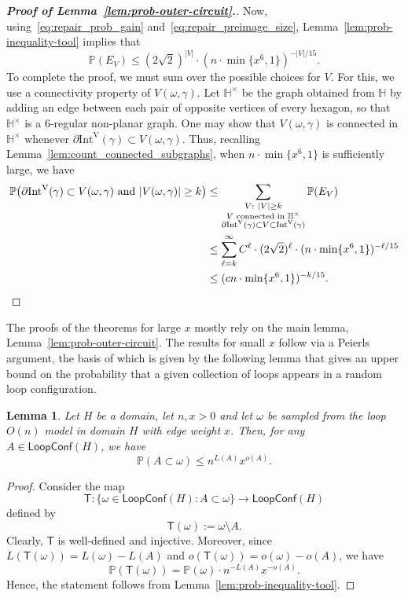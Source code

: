 \documentclass[12pt,reqno]{article}
\newtheorem{lemma}[theorem]{Lemma}
\renewcommand{\Pr}{\mathbb{P}}
\newcommand{\HH}{\mathbb{H}}
\newcommand{\LC}{\mathsf{LoopConf}}
\newcommand{\sfT}{\mathsf{T}}
\newcommand{\IntVert}[1]{\mathrm{Int}^\mathrm{V}(#1)}
\begin{document}
\begin{proof}[{\bf Proof of Lemma~\ref{lem:prob-outer-circuit}.}]
Now, using~\eqref{eq:repair_prob_gain} and~\eqref{eq:repair_preimage_size}, Lemma~\ref{lem:prob-inequality-tool} implies that
\[ \Pr(E_V) \le (2\sqrt{2})^{|V|} \cdot (n \cdot \min\{x^6,1\})^{-|V|/15} .\]
To complete the proof, we must sum over the possible choices for $V$.
For this, we use a connectivity property of $V(\omega,\gamma)$. Let $\HH^{\times}$ be the graph obtained from $\HH$ by adding an edge between each pair of opposite vertices of every hexagon, so that $\HH^{\times}$ is a $6$-regular non-planar graph.
One may show that $V(\omega,\gamma)$ is connected in $\HH^{\times}$ whenever $\partial\IntVert\gamma\subset V(\omega,\gamma)$. Thus, recalling Lemma~\ref{lem:count_connected_subgraphs}, when $n \cdot \min\{x^6,1\}$ is sufficiently large, we have
\begin{align*}
\Pr\big(\partial\IntVert\gamma\subset V(\omega,\gamma)\text{ and }|V(\omega,\gamma)|\ge k \big)
 &\le \sum_{\substack{V:~ |V| \ge k\\V\text{ connected in }\HH^\times\\\partial \IntVert\gamma \subset V \subset \IntVert\gamma}} \Pr(E_V) \\
&\le \sum_{\ell=k}^\infty C^\ell \cdot (2\sqrt{2})^\ell \cdot (n \cdot \min\{x^6,1\})^{-\ell/15} \\&\le (cn \cdot \min\{x^6,1\})^{-k/15} . \qedhere
\end{align*}
\end{proof}


%
%

\medbreak
{}
\label{sec:exponential_decay_loop_lengths}
The proofs of the theorems for large $x$ mostly rely on the main lemma, Lemma~\ref{lem:prob-outer-circuit}.
The results for small $x$ follow via a Peierls argument, the basis of which is given by the following lemma that gives an upper bound on the probability that a given collection of loops appears in a random
loop configuration.

\begin{lemma}\label{lem:given-loops-are-unlikely}
    Let $H$ be a domain, let $n,x>0$ and let $\omega$ be sampled from the loop $O(n)$ model in domain $H$ with edge weight $x$. Then, for any $A \in \LC(H)$, we have
    \[ \Pr(A \subset \omega) \le n^{L(A)}x^{o(A)} .\]
\end{lemma}
\begin{proof}
    Consider the map
    \[ \sfT \colon \{ \omega \in \LC(H) :  A \subset \omega \} \to \LC(H) \]
    defined by
    \[ \sfT(\omega) := \omega \setminus A .\]
    Clearly, $\sfT$ is well-defined and injective.
    Moreover, since $L(\sfT(\omega)) = L(\omega) - L(A)$ and $o(\sfT(\omega)) = o(\omega) - o(A)$, we have
    \[ \Pr(\sfT(\omega)) = \Pr(\omega) \cdot n^{-L(A)} x^{-o(A)} .\]
    Hence, the statement follows from Lemma~\ref{lem:prob-inequality-tool}.
\end{proof}
\end{document}
